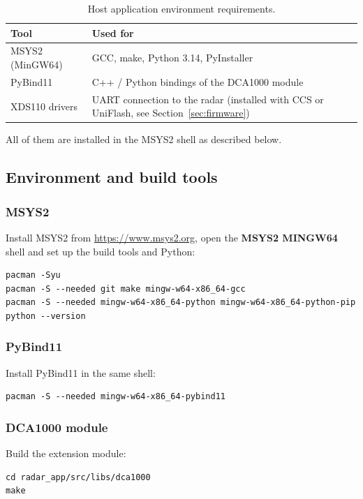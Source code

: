 \documentclass[12pt, a4paper]{article}
\begin{document}
\begin{table}[H]
\caption{Host application environment requirements.}
\centering
\begin{tabularx}{\textwidth}{|l|X|}
\hline
\textbf{Tool} & \textbf{Used for} \\
\hline
MSYS2 (MinGW64) & GCC, make, Python 3.14, PyInstaller \\
\hline
PyBind11 & C++ / Python bindings of the DCA1000 module \\
\hline
XDS110 drivers & UART connection to the radar (installed with CCS or UniFlash, see Section~\ref{sec:firmware}) \\
\hline
\end{tabularx}
\end{table}

All of them are installed in the MSYS2 shell as described below.

\subsection{Environment and build tools}

\subsubsection{MSYS2}

Install MSYS2 from \url{https://www.msys2.org}, open the \textbf{MSYS2 MINGW64} shell and
set up the build tools and Python:
\begin{lstlisting}
pacman -Syu
pacman -S --needed git make mingw-w64-x86_64-gcc
pacman -S --needed mingw-w64-x86_64-python mingw-w64-x86_64-python-pip
python --version
\end{lstlisting}

\subsubsection{PyBind11}

Install PyBind11 in the same shell:
\begin{lstlisting}
pacman -S --needed mingw-w64-x86_64-pybind11
\end{lstlisting}

\subsubsection{DCA1000 module}

Build the extension module:
\begin{lstlisting}
cd radar_app/src/libs/dca1000
make
\end{lstlisting}
\end{document}

